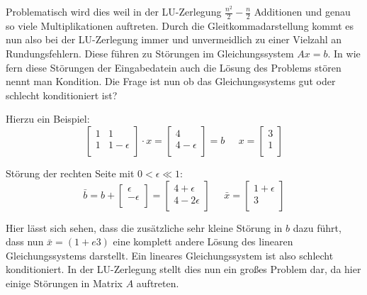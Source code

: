 \documentclass[course=erap]{aspdoc}
\begin{document}
Problematisch wird dies weil in der LU-Zerlegung $\frac{n^2}{2} - \frac{n}{2} $
Additionen und genau so viele Multiplikationen auftreten\cite{LUGenauigkeit}.
Durch die Gleitkommadarstellung kommt es nun also bei der LU-Zerlegung immer und 
unvermeidlich zu einer Vielzahl an Rundungsfehlern. Diese führen zu Störungen im Gleichungssystem $Ax=b$. 
In wie fern diese Störungen der Eingabedatein auch die Lösung des Problems stören nennt man Kondition. 
Die Frage ist nun ob das Gleichungssystems gut oder schlecht konditioniert ist?

Hierzu ein Beispiel:
  \begin{equation}
    \label{absBeis}
    \begin{bmatrix}
    1	& 1	 \\
    1	& 1-\epsilon\\
    \end{bmatrix}
    \cdot x = 
    \begin{bmatrix}
    4 \\
    4- \epsilon\\
    \end{bmatrix}
    = b\;\;\;\;\;
    x = 
    \begin{bmatrix}
    3 \\
    1\\
    \end{bmatrix}
  \end{equation}

Störung der rechten Seite mit $ 0 < \epsilon \ll 1$:
  \begin{equation}
    \label{absBeis2}
    \bar{b} = b + 
    \begin{bmatrix}
    \epsilon \\
    -\epsilon\\
    \end{bmatrix}
    = \begin{bmatrix}
    4 + \epsilon\\
    4- 2\epsilon\\
    \end{bmatrix}
    \;\;\;\;\;
    \bar{x} = 
    \begin{bmatrix}
    1 + \epsilon \\
    3\\
    \end{bmatrix}
  \end{equation}

Hier lässt sich sehen, dass die zusätzliche sehr kleine Störung in $b$ dazu führt, 
dass nun $\bar{x} = ( 1+e 3)$ eine komplett andere Lösung des linearen Gleichungssystems darstellt.
Ein lineares Gleichungssystem ist also schlecht konditioniert. In der LU-Zerlegung stellt dies nun ein großes 
Problem dar, da hier einige Störungen in Matrix $A$ auftreten.
\end{document}
